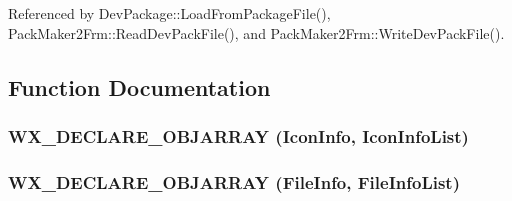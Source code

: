 Referenced by Dev\-Package::Load\-From\-Package\-File(), Pack\-Maker2Frm::Read\-Dev\-Pack\-File(), and Pack\-Maker2Frm::Write\-Dev\-Pack\-File().

\subsection{Function Documentation}
\subsubsection{\setlength{\rightskip}{0pt plus 5cm}WX\_\-DECLARE\_\-OBJARRAY ({\bf Icon\-Info}, Icon\-Info\-List)}\label{_package_classes_8h_537cb0246577e86fa9ab756e7f897dab}


\subsubsection{\setlength{\rightskip}{0pt plus 5cm}WX\_\-DECLARE\_\-OBJARRAY ({\bf File\-Info}, File\-Info\-List)}\label{_package_classes_8h_5b58328d2963610235c370061116e546}



